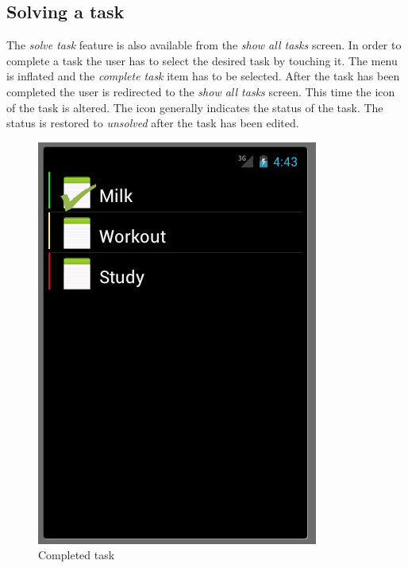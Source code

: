 \subsection{Solving a task}
The \emph{solve task} feature is also available from the \emph{show all tasks}
screen. In order to complete a task the user has to select the
desired task by touching it. The menu is inflated and the \emph{complete task}
item has to be selected. After the task has been completed the user is
redirected to the \emph{show all tasks} screen. This time the icon of the task
is altered. The icon generally indicates the status of the task.
The status is restored to \emph{unsolved} after the task has been edited.
 \begin{figure}[h]
  \caption{Completed task}
  \center
  	\includegraphics[scale=0.25]{../resources/completed-task.png}
\end{figure}

